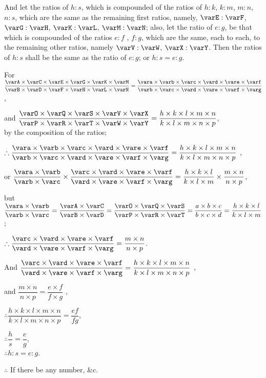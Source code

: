 \documentclass[booklanguage=english]{byrnebook}
\begin{document}
And let the ratios of $h : s$, which is compounded of the ratios of $h : k$, $k : m$, $m : n$, $n : s$, which are the same as the remaining first ratios, namely, $\varE : \varF$, $\varG : \varH$, $\varK : \varL$, $\varM : \varN$; also, let the ratio of $e : g$, be that which is compounded of the ratios $e : f$ , $f : g$, which are the same, each to each, to the remaining other ratios, namely $\varV : \varW$, $\varX : \varY$. Then the ratios of $h : s$ shall be the same as the ratio of $e : g$; or $h : s = e : g$.

\begin{center}
For $\dfrac
{\varA \times \varC \times \varE \times \varG \times \varK \times \varM}
{\varB \times \varD \times \varF \times \varH \times \varL \times \varN}
=
\dfrac
{\vara \times \varb \times \varc \times \vard \times \vare \times \varf}
{\varb \times \varc \times \vard \times \vare \times \varf \times \varg}$,

and $\dfrac
{\varO \times \varQ \times \varS \times \varV \times \varX}
{\varP \times \varR \times \varT \times \varW \times \varY}
=
\dfrac
{h \times k \times l \times m \times n}
{k \times l \times m \times n \times p}$,\\
by the composition of the ratios;

$\therefore \dfrac
{\vara \times \varb \times \varc \times \vard \times \vare \times \varf}
{\varb \times \varc \times \vard \times \vare \times \varf \times \varg}
=
\dfrac
{h \times k \times l \times m \times n}
{k \times l \times m \times n \times p}$ \byref{\hypref},

or $\dfrac{\vara \times \varb}{\varb \times \varc}
\times
\dfrac
{\varc \times \vard \times \vare \times \varf}
{\vard \times \vare \times \varf \times \varg}
=
\dfrac
{h \times k \times l}
{k \times l \times m}
\times
\dfrac
{m \times n}
{n \times p}$,

but $\dfrac{\vara \times \varb}{\varb \times \varc} = \dfrac{\varA \times \varC}{\varB \times \varD}
=
\dfrac
{\varO \times \varQ \times \varS}
{\varP \times \varR \times \varT}
=
\dfrac{a \times b \times c}{b \times c \times d}
=
\dfrac{h \times k \times l}{k \times l \times m}$;

$\therefore
\dfrac
{\varc \times \vard \times \vare \times \varf}
{\vard \times \vare \times \varf \times \varg}
=
\dfrac
{m \times n}
{n \times p}$.

And $\dfrac
{\varc \times \vard \times \vare \times \varf}
{\vard \times \vare \times \varf \times \varg}
= \dfrac
{h \times k \times l \times m \times n}
{k \times l \times m \times n \times p}$ \byref{\hypref},

and $\dfrac
{m \times n}
{n \times p}
=
\dfrac
{e \times f}
{f \times g}$ \byref{\hypref},

$\therefore \dfrac
{h \times k \times l \times m \times n}
{k \times l \times m \times n \times p}
= \dfrac{e f}{f g}$,

$\therefore \dfrac{h}{s} = \dfrac{e}{g}$,\\
$\therefore h : s = e : g$.

$\therefore$ If there be any number, \&c.
\end{center}
\end{document}
